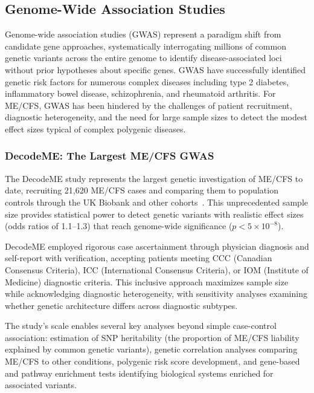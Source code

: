 \subsection{Genome-Wide Association Studies}
\label{sec:gwas}

Genome-wide association studies (GWAS) represent a paradigm shift from candidate gene approaches, systematically interrogating millions of common genetic variants across the entire genome to identify disease-associated loci without prior hypotheses about specific genes. GWAS have successfully identified genetic risk factors for numerous complex diseases including type 2 diabetes, inflammatory bowel disease, schizophrenia, and rheumatoid arthritis. For ME/CFS, GWAS has been hindered by the challenges of patient recruitment, diagnostic heterogeneity, and the need for large sample sizes to detect the modest effect sizes typical of complex polygenic diseases.

\subsubsection{DecodeME: The Largest ME/CFS GWAS}

\begin{achievement}
\label{ach:decodeme-gwas}
The DecodeME study represents the largest genetic investigation of ME/CFS to date, recruiting 21,620 ME/CFS cases and comparing them to population controls through the UK Biobank and other cohorts~\cite{DecodeME2025}. This unprecedented sample size provides statistical power to detect genetic variants with realistic effect sizes (odds ratios of 1.1--1.3) that reach genome-wide significance ($p < 5 \times 10^{-8}$).

DecodeME employed rigorous case ascertainment through physician diagnosis and self-report with verification, accepting patients meeting CCC (Canadian Consensus Criteria), ICC (International Consensus Criteria), or IOM (Institute of Medicine) diagnostic criteria. This inclusive approach maximizes sample size while acknowledging diagnostic heterogeneity, with sensitivity analyses examining whether genetic architecture differs across diagnostic subtypes.

The study's scale enables several key analyses beyond simple case-control association: estimation of SNP heritability (the proportion of ME/CFS liability explained by common genetic variants), genetic correlation analyses comparing ME/CFS to other conditions, polygenic risk score development, and gene-based and pathway enrichment tests identifying biological systems enriched for associated variants.
\end{achievement}

